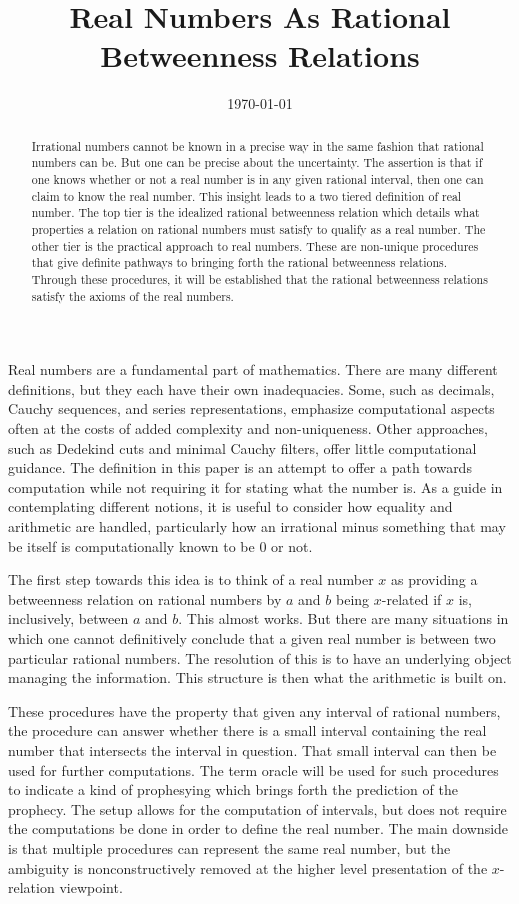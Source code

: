\documentclass[12pt]{article}
\title{Real Numbers As Rational Betweenness Relations}
\date{\today}
\begin{document}
\maketitle
\begin{abstract}
Irrational numbers cannot be known in a precise way in the same fashion that rational numbers can be. But one can be precise about the uncertainty. The assertion is that if one knows whether or not a real number is in any given rational interval, then one can claim to know the real number. This insight leads to a two tiered definition of real number. The top tier is the idealized rational betweenness relation which details what properties a relation on rational numbers must satisfy to qualify as a real number. The other tier is the practical approach to real numbers. These are non-unique procedures that give definite pathways to bringing forth the rational betweenness relations. Through these procedures, it will be established that the rational betweenness relations satisfy the axioms of the real numbers. 
\end{abstract}

Real numbers are a fundamental part of mathematics. There are many different definitions, but they each have their own inadequacies. Some, such as decimals, Cauchy sequences, and series representations, emphasize computational aspects often at the costs of added complexity and non-uniqueness. Other approaches, such as Dedekind cuts and minimal Cauchy filters, offer little computational guidance. The definition in this paper is an attempt to offer a path towards computation while not requiring it for stating what the number is. As a guide in contemplating different notions, it is useful to consider how equality and arithmetic are handled, particularly how an irrational minus something that may be itself is computationally known to be 0 or not. 

The first step towards this idea is to think of a real number $x$ as providing a betweenness relation on rational numbers by $a$ and $b$ being $x$-related if $x$ is, inclusively, between $a$ and $b$. This almost works. But there are many situations in which one cannot definitively conclude that a given real number is between two particular rational numbers. The resolution of this is to have an underlying object managing the information. This structure is then what the arithmetic is built on.

These procedures have the property that given any interval of rational numbers, the procedure can answer whether there is a small interval containing the real number that intersects the interval in question. That small interval can then be used for further computations. The term oracle will be used for such procedures to indicate a kind of prophesying which brings forth the prediction of the prophecy. The setup allows for the computation of intervals, but does not require the computations be done in order to define the real number. The main downside is that multiple procedures can represent the same real number, but the ambiguity is nonconstructively removed at the higher level presentation of the $x$-relation viewpoint.  
\end{document}
